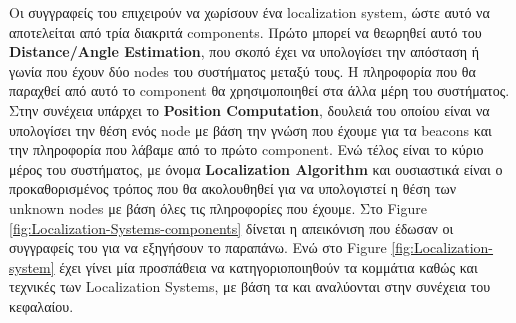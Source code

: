 Οι συγγραφείς του \cite{wsn-Localization-systems} επιχειρούν να χωρίσουν ένα localization system, ώστε 
αυτό να αποτελείται από τρία διακριτά components. Πρώτο μπορεί να θεωρηθεί αυτό του \textbf{Distance/Angle Estimation}, 
που σκοπό έχει να υπολογίσει την απόσταση ή γωνία που έχουν δύο nodes του συστήματος μεταξύ τους.
Η πληροφορία που θα παραχθεί από αυτό το component θα χρησιμοποιηθεί στα άλλα μέρη του συστήματος.
Στην συνέχεια υπάρχει το \textbf{Position Computation}, δουλειά του οποίου είναι να υπολογίσει την θέση ενός
node με βάση την γνώση που έχουμε για τα beacons και την πληροφορία που λάβαμε από το πρώτο component.
Ενώ τέλος είναι το κύριο μέρος του συστήματος, με όνομα \textbf{Localization Algorithm} και ουσιαστικά είναι
ο προκαθορισμένος τρόπος που θα ακολουθηθεί για να υπολογιστεί η θέση των unknown nodes με βάση όλες τις 
πληροφορίες που έχουμε.
Στο Figure \ref{fig:Localization-Systems-components} δίνεται η απεικόνιση που έδωσαν οι συγγραφείς του 
\cite{wsn-Localization-systems} για να εξηγήσουν το παραπάνω. Ενώ στο Figure \ref{fig:Localization-system}
έχει γίνει μία προσπάθεια να κατηγοριοποιηθούν τα κομμάτια καθώς και τεχνικές των Localization Systems,
με βάση τα \cite{farooqiazam2016location} \cite{wsn-Localization-systems} \cite{wsn-Localization-techniques}
και αναλύονται στην συνέχεια του κεφαλαίου.

